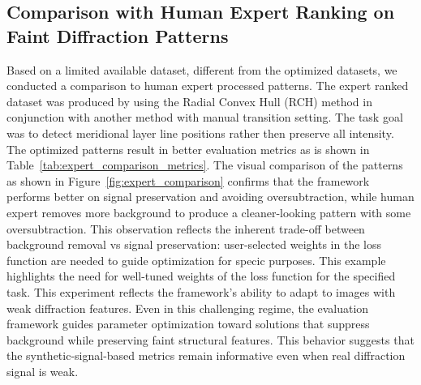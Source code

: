 \documentclass[iucr]{iucrjournals}
\begin{document}
\subsection{Comparison with Human Expert Ranking on Faint Diffraction Patterns}

Based on a limited available dataset, different from the optimized datasets, we conducted a comparison to human expert processed patterns. The expert ranked dataset was produced by using the Radial Convex Hull (RCH) method in conjunction with another method with manual transition setting. The task goal was to detect meridional layer line positions rather then preserve all intensity. The optimized patterns result in better evaluation metrics as is shown in Table~\ref{tab:expert_comparison_metrics}. The visual comparison of the patterns as shown in Figure~\ref{fig:expert_comparison} confirms that the framework performs better on signal preservation and avoiding oversubtraction, while human expert removes more background to produce a cleaner-looking pattern with some oversubtraction. This observation reflects the inherent trade-off between background removal vs signal preservation: user-selected weights in the loss function are needed to guide optimization for specic purposes. This example highlights the need for well-tuned weights of the loss function for the specified task. This experiment reflects the framework's ability to adapt to images with weak diffraction features. Even in this challenging regime, the evaluation framework guides parameter optimization toward solutions that suppress background while preserving faint structural features. This behavior suggests that the synthetic-signal-based metrics remain informative even when real diffraction signal is weak.

\end{document}

